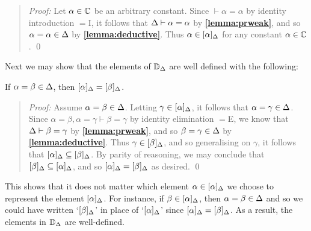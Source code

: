 \begin{quote} 
  \textit{Proof:} 
  Let $\alpha\in\mathbb{C}$ be an arbitrary constant. 
  Since $\vdash \alpha=\alpha$ by identity introduction $=$I, it follows that $\Delta\vdash\alpha=\alpha$ by \textbf{\ref{lemma:prweak}}, and so $\alpha=\alpha\in\Delta$ by \textbf{\ref{lemma:deductive}}.
  Thus $\alpha\in[\alpha]_{\Delta}$ for any constant $\alpha\in\mathbb{C}$.
  \qed
\end{quote}

Next we may show that the elements of $\mathbb{D}_{\Delta}$ are well defined with the following: 

\begin{Lthm} \label{lemma:define}
  If $\alpha=\beta\in\Delta$, then $[\alpha]_{\Delta}=[\beta]_{\Delta}$.
\end{Lthm}

\begin{quote} 
  \textit{Proof:}
  Assume $\alpha=\beta\in\Delta$.
  Letting $\gamma\in[\alpha]_{\Delta}$, it follows that $\alpha=\gamma\in\Delta$.
  Since $\alpha=\beta,\alpha=\gamma\vdash\beta=\gamma$ by identity elimination $=$E, we know that $\Delta\vdash\beta=\gamma$ by \textbf{\ref{lemma:prweak}}, and so $\beta=\gamma\in\Delta$ by \textbf{\ref{lemma:deductive}}. 
  Thus $\gamma\in[\beta]_{\Delta}$, and so generalising on $\gamma$, it follows that $[\alpha]_{\Delta}\subseteq[\beta]_{\Delta}$.
  By parity of reasoning, we may conclude that $[\beta]_{\Delta}\subseteq[\alpha]_{\Delta}$, and so $[\alpha]_{\Delta}=[\beta]_{\Delta}$ as desired.
  \qed
\end{quote}

This shows that it does not matter which element $\alpha\in[\alpha]_{\Delta}$ we choose to represent the element $[\alpha]_{\Delta}$.
For instance, if $\beta\in[\alpha]_{\Delta}$, then $\alpha=\beta\in\Delta$ and so we could have written `$[\beta]_{\Delta}$' in place of `$[\alpha]_{\Delta}$' since $[\alpha]_{\Delta}=[\beta]_{\Delta}$.
As a result, the elements in $\mathbb{D}_{\Delta}$ are well-defined. 

